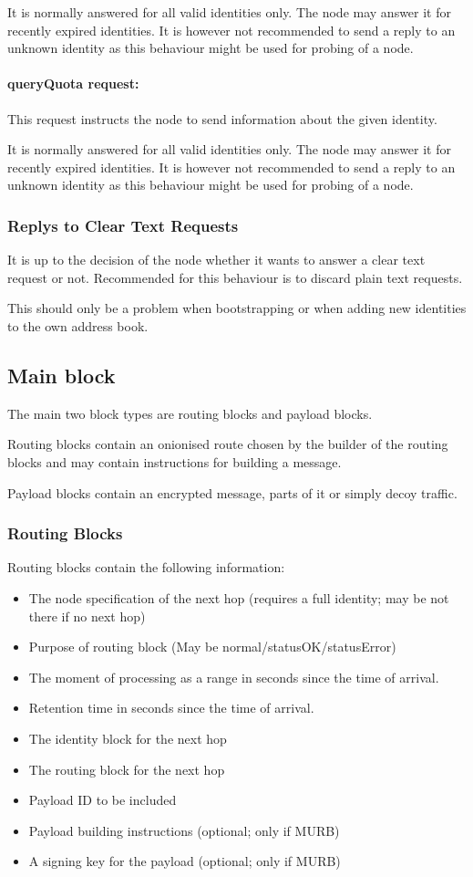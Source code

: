 It is normally answered for all valid identities only. The node may answer it for recently expired identities. It is however not recommended to send a reply to an unknown identity as this behaviour might be used for probing of a node.

\paragraph{queryQuota request:} This request instructs the node to send information about the given identity.

It is normally answered for all valid identities only. The node may answer it for recently expired identities. It is however not recommended to send a reply to an unknown identity as this behaviour might be used for probing of a node.

\subsubsection{Replys to Clear Text Requests}
It is up to the decision of the node whether it wants to answer a clear text request or not. Recommended for this behaviour is to discard plain text requests. 

This should only be a problem when bootstrapping or when adding new identities to the own address book. 

\subsection{Main block}
The main two block types are routing blocks and payload blocks. 

Routing blocks contain an onionised route chosen by the builder of the routing blocks and may contain instructions for building a message.

Payload blocks contain an encrypted message, parts of it or simply decoy traffic.

\subsubsection{Routing Blocks}
Routing blocks contain the following information:
\begin{itemize}
	\item The node specification of the next hop (requires a full identity; may be not there if no next hop)
	\item Purpose of routing block (May be normal/statusOK/statusError)
	\item The moment of processing as a range in seconds since the time of arrival.
	\item Retention time in seconds since the time of arrival.
	\item The identity block for the next hop
	\item The routing block for the next hop
	\item Payload ID to be included
	\item Payload building instructions (optional; only if MURB)
	\item A signing key for the payload (optional; only if MURB)
\end{itemize}

